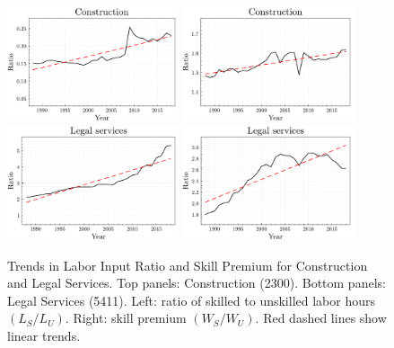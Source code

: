 \documentclass[12pt]{article}
\begin{document}
\begin{figure}%
 \includegraphics[width=0.45\textwidth]{../images/industries/labor_input_ratio/inc23.pdf}
 \hfill
 \includegraphics[width=0.45\textwidth]{../images/industries/skill_premium/inc23.pdf}
 \vfill
 \includegraphics[width=0.45\textwidth]{../images/industries/labor_input_ratio/inc5411.pdf}
 \hfill
 \includegraphics[width=0.45\textwidth]{../images/industries/skill_premium/inc5411.pdf}
 
 \caption{\label{fig:labor_input_skill_premium_trends_s_ind} Trends in Labor Input Ratio and Skill Premium for Construction and Legal Services. Top panels: Construction (2300). Bottom panels: Legal Services (5411). Left: ratio of skilled to unskilled labor hours $(L_S/L_U)$. Right: skill premium $(W_S/W_U)$. Red dashed lines show linear trends.}
\end{figure}
\end{document}
